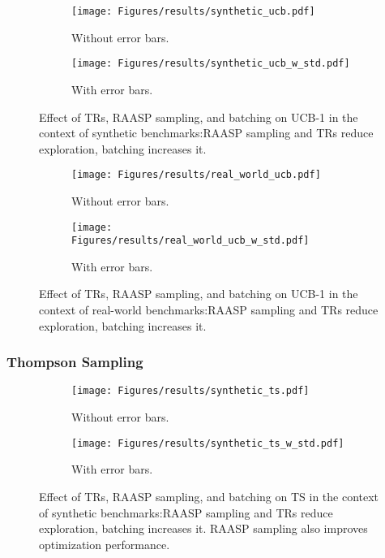\documentclass[accepted]{uai2025}
\begin{document}
\begin{figure}[H]
    \centering
    \begin{subfigure}{0.48\linewidth}
    \texttt{[image: Figures/results/synthetic\_ucb.pdf]}
    \caption{Without error bars.}
    \end{subfigure}
    \begin{subfigure}{0.48\linewidth}
    \texttt{[image: Figures/results/synthetic\_ucb\_w\_std.pdf]}
    \caption{With error bars.}
    \end{subfigure}
    \caption{Effect of \acp{TR}, \ac{RAASP} sampling, and batching on \ac{UCB}-1 in the context of synthetic benchmarks:\ac{RAASP} sampling and \acp{TR} reduce exploration, batching increases it.}
\end{figure}

\begin{figure}[H]
    \centering
    \begin{subfigure}{0.48\linewidth}
    \texttt{[image: Figures/results/real\_world\_ucb.pdf]}
    \caption{Without error bars.}
    \end{subfigure}
    \begin{subfigure}{0.48\linewidth}
    \texttt{[image: Figures/results/real\_world\_ucb\_w\_std.pdf]}
    \caption{With error bars.}
    \end{subfigure}
    \caption{Effect of \acp{TR}, \ac{RAASP} sampling, and batching on \ac{UCB}-1 in the context of real-world benchmarks:\ac{RAASP} sampling and \acp{TR} reduce exploration, batching increases it.}
\end{figure}

\subsubsection{Thompson Sampling}

\begin{figure}[H]
    \centering
    \begin{subfigure}{0.48\linewidth}
    \texttt{[image: Figures/results/synthetic\_ts.pdf]}
    \caption{Without error bars.}
    \end{subfigure}
    \begin{subfigure}{0.48\linewidth}
    \texttt{[image: Figures/results/synthetic\_ts\_w\_std.pdf]}
    \caption{With error bars.}
    \end{subfigure}
    \caption{Effect of \acp{TR}, \ac{RAASP} sampling, and batching on \ac{TS} in the context of synthetic benchmarks:\ac{RAASP} sampling and \acp{TR} reduce exploration, batching increases it. \ac{RAASP} sampling also improves optimization performance.}
\end{figure}
\end{document}
